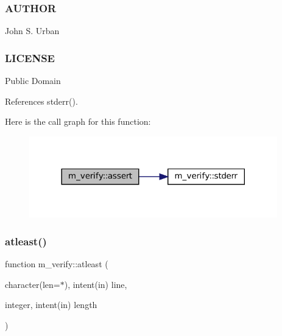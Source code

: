 \subsubsection*{A\+U\+T\+H\+OR}

John S. Urban \subsubsection*{L\+I\+C\+E\+N\+SE}

Public Domain 

References stderr().

Here is the call graph for this function\+:\nopagebreak
\begin{figure}[H]
\begin{center}
\leavevmode
\includegraphics[width=305pt]{namespacem__verify_a83a6bafddb101d8b0fe70f34827836ff_cgraph}
\end{center}
\end{figure}
\mbox{\label{namespacem__verify_a6185c00609b8f0e4c5a503cfadcb2490}} 
\subsubsection{\texorpdfstring{atleast()}{atleast()}}
{\footnotesize\ttfamily function m\+\_\+verify\+::atleast (\begin{DoxyParamCaption}\item[{character(len=$\ast$), intent(in)}]{line,  }\item[{integer, intent(in)}]{length }\end{DoxyParamCaption})\hspace{0.3cm}{\ttfamily [private]}}

